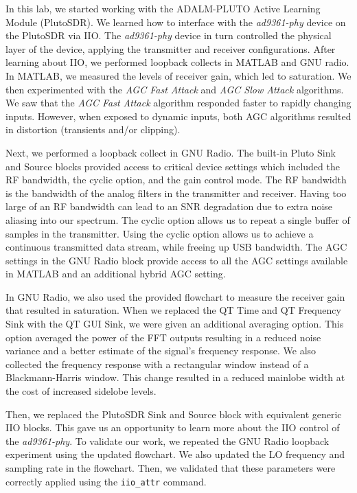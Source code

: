 \documentclass{article}
\begin{document}
In this lab, we started working with the ADALM-PLUTO Active Learning Module (PlutoSDR). We learned how to interface with the \textit{ad9361-phy} device on the PlutoSDR via IIO. The \textit{ad9361-phy} device in turn controlled the physical layer of the device, applying the transmitter and receiver configurations. After learning about IIO, we performed loopback collects in MATLAB and GNU radio. In MATLAB, we measured the levels of receiver gain, which led to saturation. We then experimented with the \textit{AGC Fast Attack} and \textit{AGC Slow Attack} algorithms. We saw that the \textit{AGC Fast Attack} algorithm responded faster to rapidly changing inputs. However, when exposed to dynamic inputs, both AGC algorithms resulted in distortion (transients and/or clipping).

Next, we performed a loopback collect in GNU Radio. The built-in Pluto Sink and Source blocks provided access to critical device settings which included the RF bandwidth, the cyclic option, and the gain control mode. The RF bandwidth is the bandwidth of the analog filters in the transmitter and receiver. Having too large of an RF bandwidth can lead to an SNR degradation due to extra noise aliasing into our spectrum. The cyclic option allows us to repeat a single buffer of samples in the transmitter. Using the cyclic option allows us to achieve a continuous transmitted data stream, while freeing up USB bandwidth. The AGC settings in the GNU Radio block provide access to all the AGC settings available in MATLAB and an additional hybrid AGC setting. 

In GNU Radio, we also used the provided flowchart to measure the receiver gain that resulted in saturation. When we replaced the QT Time and QT Frequency Sink with the QT GUI Sink, we were given an additional averaging option. This option averaged the power of the FFT outputs resulting in a reduced noise variance and a better estimate of the signal's frequency response. We also collected the frequency response with a rectangular window instead of a Blackmann-Harris window. This change resulted in a reduced mainlobe width at the cost of increased sidelobe levels.

Then, we replaced the PlutoSDR Sink and Source block with equivalent generic IIO blocks. This gave us an opportunity to learn more about the IIO control of the \textit{ad9361-phy}. To validate our work, we repeated the GNU Radio loopback experiment using the updated flowchart. We also updated the LO frequency and sampling rate in the flowchart. Then, we validated that these parameters were correctly applied using the \texttt{iio\_attr} command.
\end{document}
